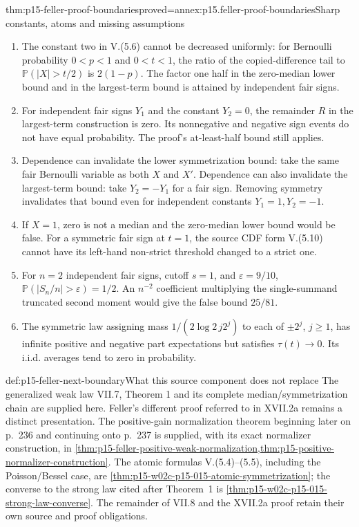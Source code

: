 \begin{hbtheorem}{thm:p15-feller-proof-boundaries}{proved=annex:p15.feller-proof-boundaries}{Sharp constants, atoms and missing assumptions}
\begin{enumerate}
\item The constant two in V.(5.6) cannot be decreased uniformly:
for Bernoulli probability \(0<p<1\) and \(0<t<1\), the ratio of the
copied-difference tail to \(\mathbb P(|X|>t/2)\) is \(2(1-p)\).
The factor one half in the zero-median lower bound and in the
largest-term bound is attained by independent fair signs.
\item For independent fair signs \(Y_1\) and the constant \(Y_2=0\),
the remainder \(R\) in the largest-term construction is zero.
Its nonnegative and negative sign events do not have equal probability.
The proof's at-least-half bound still applies.
\item Dependence can invalidate the lower symmetrization bound:
take the same fair Bernoulli variable as both \(X\) and \(X'\).
Dependence can also invalidate the largest-term bound: take
\(Y_2=-Y_1\) for a fair sign. Removing symmetry invalidates that
bound even for independent constants \(Y_1=1,Y_2=-1\).
\item If \(X=1\), zero is not a median and the zero-median lower
bound would be false. For a symmetric fair sign at \(t=1\),
the source CDF form V.(5.10) cannot have its left-hand
non-strict threshold changed to a strict one.
\item For \(n=2\) independent fair signs, cutoff \(s=1\), and
\(\varepsilon=9/10\),
\(\mathbb P(|S_n/n|>\varepsilon)=1/2\).
An \(n^{-2}\) coefficient multiplying the single-summand truncated
second moment would give the false bound \(25/81\).
\item The symmetric law assigning mass
\(1/(2\log2\,j2^j)\) to each of \(\pm2^j\), \(j\geq1\),
has infinite positive and negative part expectations but satisfies
\(\tau(t)\to0\). Its i.i.d. averages tend to zero in probability.
\end{enumerate}
\end{hbtheorem}

\begin{proofboundary}{def:p15-feller-next-boundary}{What this source component does not replace}
The generalized weak law VII.7, Theorem 1 and its complete
median/symmetrization chain are supplied here. Feller's different
proof referred to in XVII.2a remains a distinct presentation.
The positive-gain normalization theorem beginning later on p.~236
and continuing onto p.~237 is supplied, with its exact normalizer
construction, in \cref{thm:p15-feller-positive-weak-normalization,thm:p15-positive-normalizer-construction}.
The atomic formulas V.(5.4)--(5.5), including the Poisson/Bessel case,
are \cref{thm:p15-w02c-p15-015-atomic-symmetrization}; the converse to
the strong law cited after Theorem~1 is
\cref{thm:p15-w02c-p15-015-strong-law-converse}. The remainder of
VII.8 and the XVII.2a proof retain their own source and proof
obligations.
\end{proofboundary}
